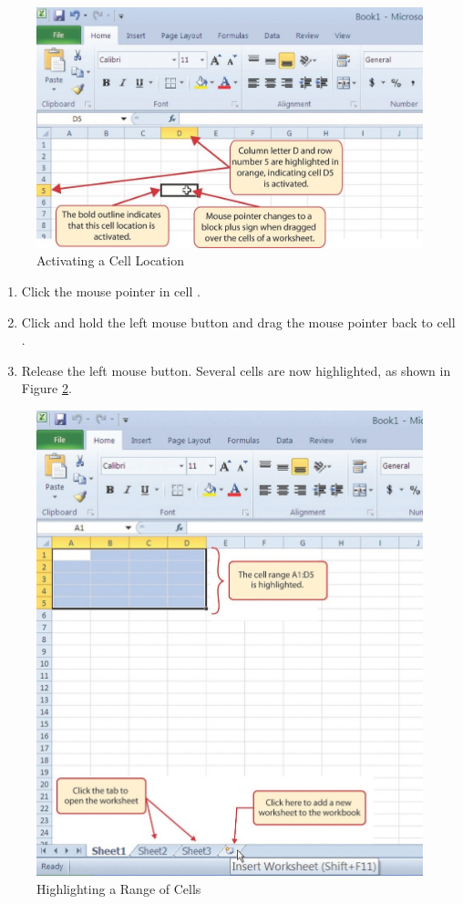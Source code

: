\begin{figure}[H]
	\centering
	\includegraphics[width=\maxwidth{.95\linewidth}]{gfx/ch01_fig04}
	\caption{Activating a Cell Location}
	\label{01:fig04}
\end{figure}

\begin{enumerate}
	\item Click the mouse pointer in cell .
	\item Click and hold the left mouse button and drag the mouse pointer back to cell .
	\item Release the left mouse button. Several cells are now highlighted, as shown in Figure \ref{01:fig05}.
\end{enumerate}

\begin{figure}[H]
	\centering
	\includegraphics[width=\maxwidth{.95\linewidth}]{gfx/ch01_fig05}
	\caption{Highlighting a Range of Cells}
	\label{01:fig05}
\end{figure}

